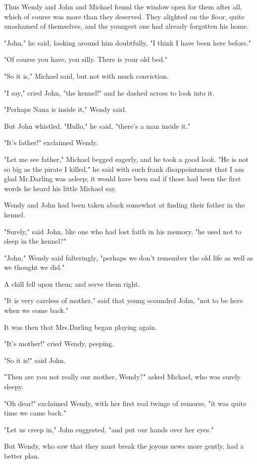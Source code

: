 Thus Wendy and John and Michael found the window open for them after all,
which of course was more than they deserved.
They alighted on the floor, quite unashamed of themselves,
and the youngest one had already forgotten his home.

"John," he said, looking around him doubtfully,
"I think I have been here before."

"Of course you have, you silly.
There is your old bed."

"So it is," Michael said, but not with much conviction.

"I say," cried John, "the kennel!\@" and he dashed across to look into it.

"Perhaps Nana is inside it," Wendy said.

But John whistled.
"Hullo," he said, "there's a man inside it."

"It's father!\@" exclaimed Wendy.

"Let me see father," Michael begged eagerly, and he took a good look.
"He is not so big as the pirate I killed,"
he said with such frank disappointment that I am glad Mr.\@ Darling was asleep;
it would have been sad if those had been the first words he heard his little Michael say.

Wendy and John had been taken aback somewhat at finding their father in the kennel.

"Surely," said John, like one who had lost faith in his memory,
"he used not to sleep in the kennel?"

"John," Wendy said falteringly,
"perhaps we don't remember the old life as well as we thought we did."

A chill fell upon them;
and serve them right.

"It is very careless of mother," said that young scoundrel John,
"not to be here when we come back."

It was then that Mrs.\@ Darling began playing again.

"It's mother!\@" cried Wendy, peeping.

"So it is!\@" said John.

"Then are you not really our mother, Wendy?\@" asked Michael, who was surely sleepy.

"Oh dear!\@" exclaimed Wendy, with her first real twinge of remorse,
"it was quite time we came back."

"Let us creep in," John suggested,
"and put our hands over her eyes."

But Wendy, who saw that they must break the joyous news more gently,
had a better plan.

